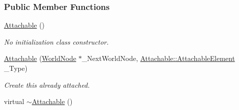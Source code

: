 \subsubsection*{Public Member Functions}
\begin{DoxyCompactItemize}
\item 
\hyperlink{classphys_1_1Attachable_a93c18f22769a1f70ae300fc2c58210eb}{Attachable} ()
\begin{DoxyCompactList}\small\item\em No initialization class constructor. \item\end{DoxyCompactList}\item 
\hypertarget{classphys_1_1Attachable_a7684ebf1fafab4345f2cedfe57345f00}{
\hyperlink{classphys_1_1Attachable_a7684ebf1fafab4345f2cedfe57345f00}{Attachable} (\hyperlink{classphys_1_1WorldNode}{WorldNode} $\ast$\_\-NextWorldNode, \hyperlink{classphys_1_1Attachable_acd1fca033e7cc0bb3024a92d466d213a}{Attachable::AttachableElement} \_\-Type)}
\label{df/dbd/classphys_1_1Attachable_a7684ebf1fafab4345f2cedfe57345f00}

\begin{DoxyCompactList}\small\item\em Create this already attached. \item\end{DoxyCompactList}\item 
\hypertarget{classphys_1_1Attachable_af7187e29053b7fe339634394883729d4}{
virtual \hyperlink{classphys_1_1Attachable_af7187e29053b7fe339634394883729d4}{$\sim$Attachable} ()}
\label{df/dbd/classphys_1_1Attachable_af7187e29053b7fe339634394883729d4}


\end{DoxyCompactItemize}
